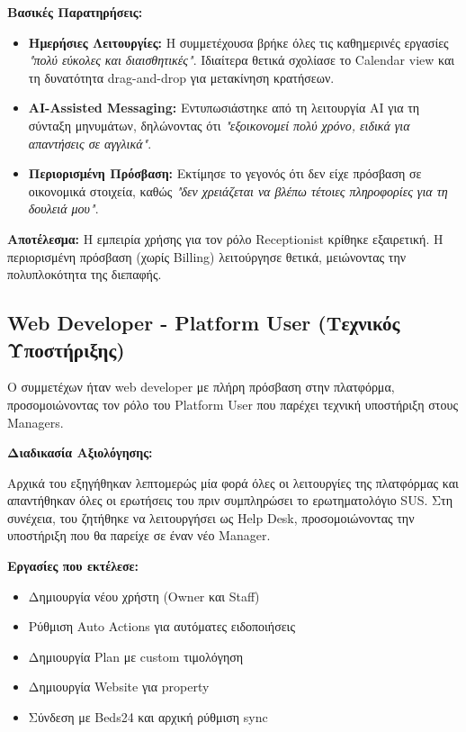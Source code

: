 \documentclass[
	12pt, %
	oneside, %
	greek,
	onehalfspacing, %
	liststotoc, %
	toctotoc, %
	parskip, %
	headsepline, %
]{MastersDoctoralThesis} %
\begin{document}
\textbf{Βασικές Παρατηρήσεις:}
\begin{itemize}
    \item \textbf{Ημερήσιες Λειτουργίες:} Η συμμετέχουσα βρήκε όλες τις καθημερινές εργασίες \textit{"πολύ εύκολες και διαισθητικές"}. Ιδιαίτερα θετικά σχολίασε το Calendar view και τη δυνατότητα drag-and-drop για μετακίνηση κρατήσεων.
    \item \textbf{AI-Assisted Messaging:} Εντυπωσιάστηκε από τη λειτουργία AI για τη σύνταξη μηνυμάτων, δηλώνοντας ότι \textit{"εξοικονομεί πολύ χρόνο, ειδικά για απαντήσεις σε αγγλικά"}.
    \item \textbf{Περιορισμένη Πρόσβαση:} Εκτίμησε το γεγονός ότι δεν είχε πρόσβαση σε οικονομικά στοιχεία, καθώς \textit{"δεν χρειάζεται να βλέπω τέτοιες πληροφορίες για τη δουλειά μου"}.
\end{itemize}

\textbf{Αποτέλεσμα:} Η εμπειρία χρήσης για τον ρόλο Receptionist κρίθηκε εξαιρετική. Η περιορισμένη πρόσβαση (χωρίς Billing) λειτούργησε θετικά, μειώνοντας την πολυπλοκότητα της διεπαφής.

\subsection{Web Developer - Platform User (Τεχνικός Υποστήριξης)}

Ο συμμετέχων ήταν web developer με πλήρη πρόσβαση στην πλατφόρμα, προσομοιώνοντας τον ρόλο του Platform User που παρέχει τεχνική υποστήριξη στους Managers.

\textbf{Διαδικασία Αξιολόγησης:}

Αρχικά του εξηγήθηκαν λεπτομερώς μία φορά όλες οι λειτουργίες της πλατφόρμας και απαντήθηκαν όλες οι ερωτήσεις του πριν συμπληρώσει το ερωτηματολόγιο SUS. Στη συνέχεια, του ζητήθηκε να λειτουργήσει ως Help Desk, προσομοιώνοντας την υποστήριξη που θα παρείχε σε έναν νέο Manager.

\textbf{Εργασίες που εκτέλεσε:}
\begin{itemize}
    \item Δημιουργία νέου χρήστη (Owner και Staff)
    \item Ρύθμιση Auto Actions για αυτόματες ειδοποιήσεις
    \item Δημιουργία Plan με custom τιμολόγηση
    \item Δημιουργία Website για property
    \item Σύνδεση με Beds24 και αρχική ρύθμιση sync
\end{itemize}
\end{document}
